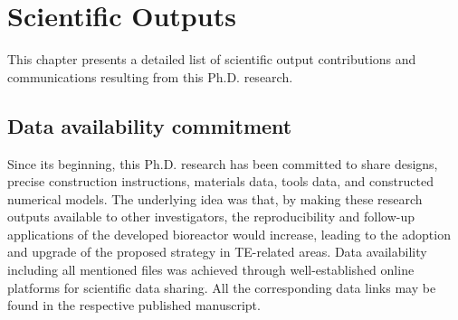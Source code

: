 %
%



\newpage
\chapter{Scientific Outputs}
This chapter presents a detailed list of scientific output contributions and communications resulting from this Ph.D. research.
\newpage




\section{Data availability commitment}
Since its beginning, this Ph.D. research has been committed to share designs, precise construction instructions, materials data, tools data, and constructed numerical models. The underlying idea was that, by making these research outputs available to other investigators, the reproducibility and follow-up applications of the developed bioreactor would increase, leading to the adoption and upgrade of the proposed strategy in TE-related areas. Data availability including all mentioned files was achieved through well-established online platforms for scientific data sharing. All the corresponding data links may be found in the respective published manuscript.  


